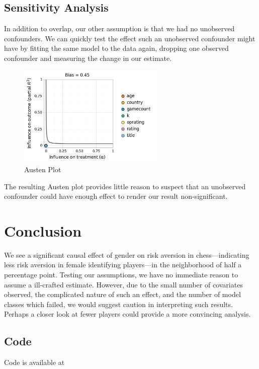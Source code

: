 \documentclass[letterpaper, 11pt]{article}
\begin{document}
    \subsection*{Sensitivity Analysis}
        
        In addition to overlap, our other assumption is that we had no unobserved confounders.
        We can quickly test the effect such an unobserved confounder might have by fitting the same model to the data again, dropping one observed confounder and measuring the change in our estimate.
        
        \begin{figure}[H]
            \centering
            \includegraphics[width=7cm]{austen_plot.png}
            \caption{Austen Plot}
        \end{figure} 

        The resulting Austen plot provides little reason to suspect that an unobserved confounder could have enough effect to render our result non-significant.

    \section*{Conclusion}
        
        We see a significant causal effect of gender on risk aversion in chess---indicating less risk aversion in female identifying players---in the neighborhood of half a percentage point.
        Testing our assumptions, we have no immediate reason to assume a ill-crafted estimate.
        However, due to the small number of covariates observed, the complicated nature of such an effect, and the number of model classes which failed, we would suggest caution in interpreting such results.
        Perhaps a closer look at fewer players could provide a more convincing analysis.

    \subsection*{Code}
        
        Code is available at 



        



\nocite{lc0}
\newpage
\printbibliography
\end{document}
